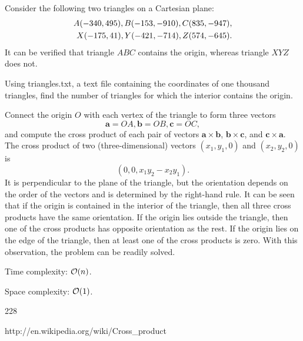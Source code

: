 

\newcommand{\va}{\mathbf{a}}
\newcommand{\vb}{\mathbf{b}}
\newcommand{\vc}{\mathbf{c}}




Consider the following two triangles on a Cartesian plane:
\begin{align}
A(-340,495), B(-153,-910), C(835,-947) , \notag \\
X(-175,41), Y(-421,-714), Z(574,-645) . \notag
\end{align}
It can be verified that triangle $ABC$ contains the origin, whereas triangle $XYZ$ does not.

Using triangles.txt, a text file containing the coordinates of one thousand triangles, find the number of triangles for which the interior contains the origin.

\solution

Connect the origin $O$ with each vertex of the triangle to form three vectors
\[
\va = OA, \vb = OB, \vc = OC ,
\]
and compute the cross product of each pair of vectors $\va \times \vb$, $\vb \times \vc$, and $\vc \times \va$. The cross product of two (three-dimensional) vectors $(x_1,y_1,0)$ and $(x_2,y_2,0)$ is
\[
\left( 0, 0, x_1 y_2 - x_2 y_1 \right ).
\]
It is perpendicular to the plane of the triangle, but the orientation depends on the order of the vectors and is determined by the right-hand rule. It can be seen that if the origin is contained in the interior of the triangle, then all three cross products have the same orientation. If the origin lies outside the triangle, then one of the cross products has opposite orientation as the rest. If the origin lies on the edge of the triangle, then at least one of the cross products is zero. With this observation, the problem can be readily solved.

\complexity

Time complexity: $\mathcal{O}(n)$.

Space complexity: $\mathcal{O}(1)$.

\answer

228


http://en.wikipedia.org/wiki/Cross\_product


